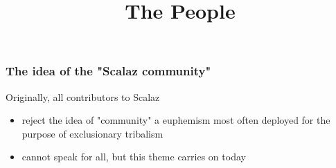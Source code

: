 {


  \begin{frame}[plain] 
  \title{The People}
  
  \vspace{3em}

  \begin{TitleBoxPeople}
    \begin{center}
    {\Large \inserttitle}
    \end{center}
  \end{TitleBoxPeople}

  \end{frame}
}


\begin{frame}
\frametitle{The idea of the "Scalaz community"}
\begin{block}{Originally, all contributors to Scalaz}
\begin{itemize}
  \item reject the idea of "community" \textemdash a euphemism most often deployed for the purpose of exclusionary tribalism
  \item cannot speak for all, but this theme carries on today
\end{itemize}
\end{block}
\end{frame}



